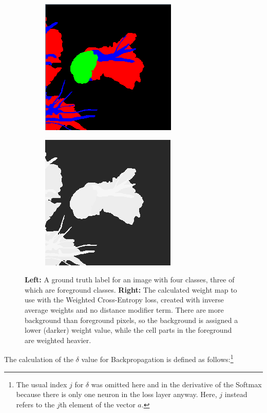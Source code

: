 \begin {figure}[!htb]
	\begin{center}
	\begin {subfigure}[b]{0.3\linewidth}
		\includegraphics{img/fig_weights_normal.png}
	\end {subfigure}\hspace{2.5cm}
	\begin {subfigure}[b]{0.3\linewidth}
		\includegraphics{img/fig_weights_weightmap.png}
	\end {subfigure}
	\end{center}

		\caption[The Cross-Entropy Loss weight map.]{\textbf{Left:} A ground truth label for an image with four classes, three of which are foreground classes. \textbf{Right:} The calculated weight map to use with the Weighted Cross-Entropy loss, created with inverse average weights and no distance modifier term. There are more background than foreground pixels, so the background is assigned a lower (darker) weight value, while the cell parts in the foreground are weighted heavier.}
		\label{fig:weight_map}

\end {figure}

\noindent The calculation of the $\delta$ value for Backpropagation is defined as follows:\footnote{The usual index $j$ for $\delta$ was omitted here and in the derivative of the Softmax because there is only one neuron in the loss layer anyway. Here, $j$ instead refers to the $j$th element of the vector $a$.}


